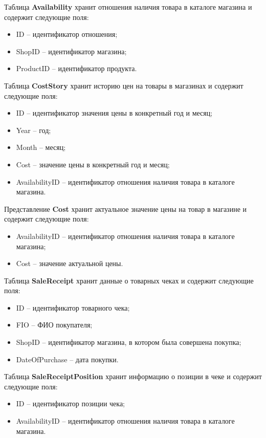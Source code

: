\documentclass{bmstu}
\begin{document}
Таблица \textbf{Availability} хранит отношения наличия товара в каталоге магазина и содержит следующие поля:
\begin{itemize}
	\setlength\itemsep{0.01em}
	\item ID -- идентификатор отношения;
	\item ShopID -- идентификатор магазина;
	\item ProductID -- идентификатор продукта.
\end{itemize}


Таблица \textbf{CostStory} хранит историю цен на товары в магазинах и содержит следующие поля:
\begin{itemize}
	\setlength\itemsep{0.01em}
	\item ID -- идентификатор значения цены в конкретный год и месяц;
	\item Year -- год;
	\item Month -- месяц;
	\item Cost -- значение цены в конкретный год и месяц;
	\item AvailabilityID -- идентификатор отношения наличия товара в каталоге магазина.
\end{itemize}


Представление \textbf{Cost} хранит актуальное значение цены на товар в магазине и содержит следующие поля:
\begin{itemize}
	\setlength\itemsep{0.01em}
	\item AvailabilityID -- идентификатор отношения наличия товара в каталоге магазина;
	\item Cost -- значение актуальной цены.
\end{itemize}


Таблица \textbf{SaleReceipt} хранит данные о товарных чеках и содержит следующие поля:
\begin{itemize}
	\setlength\itemsep{0.01em}
	\item ID -- идентификатор товарного чека;
	\item FIO -- ФИО покупателя;
	\item ShopID -- идентификатор магазина, в котором была совершена покупка;
	\item DateOfPurchase -- дата покупки.
\end{itemize}


Таблица \textbf{SaleReceiptPosition} хранит информацию о позиции в чеке и содержит следующие поля:
\begin{itemize}
	\setlength\itemsep{0.01em}
	\item ID -- идентификатор позиции чека;
	\item AvailabilityID -- идентификатор отношения наличия товара в каталоге магазина.
\end{itemize}
\end{document}
